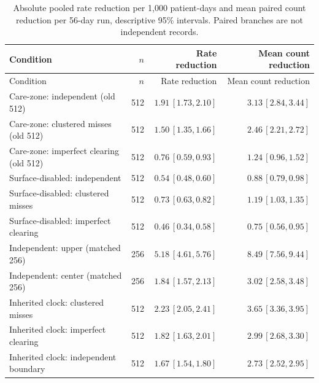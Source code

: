 \documentclass[11pt]{article}
\begin{document}
{\begin{longtable}{>{\raggedright\arraybackslash}p{.38\linewidth}rrr}
\caption{Absolute pooled rate reduction per 1,000 patient-days and mean paired count reduction per 56-day run, descriptive 95\% intervals. Paired branches are not independent records.}\label{tab:rule-absolute}\\
\toprule
Condition & $n$ & Rate reduction & Mean count reduction\\\midrule\endfirsthead
Condition & $n$ & Rate reduction & Mean count reduction\\\midrule\endhead
Care-zone: independent (old 512) & 512 & $1.91\,[1.73, 2.10]$ & $3.13\,[2.84, 3.44]$\\
Care-zone: clustered misses (old 512) & 512 & $1.50\,[1.35, 1.66]$ & $2.46\,[2.21, 2.72]$\\
Care-zone: imperfect clearing (old 512) & 512 & $0.76\,[0.59, 0.93]$ & $1.24\,[0.96, 1.52]$\\
Surface-disabled: independent & 512 & $0.54\,[0.48, 0.60]$ & $0.88\,[0.79, 0.98]$\\
Surface-disabled: clustered misses & 512 & $0.73\,[0.63, 0.82]$ & $1.19\,[1.03, 1.35]$\\
Surface-disabled: imperfect clearing & 512 & $0.46\,[0.34, 0.58]$ & $0.75\,[0.56, 0.95]$\\
Independent: upper (matched 256) & 256 & $5.18\,[4.61, 5.76]$ & $8.49\,[7.56, 9.44]$\\
Independent: center (matched 256) & 256 & $1.84\,[1.57, 2.13]$ & $3.02\,[2.58, 3.48]$\\
Inherited clock: clustered misses & 512 & $2.23\,[2.05, 2.41]$ & $3.65\,[3.36, 3.95]$\\
Inherited clock: imperfect clearing & 512 & $1.82\,[1.63, 2.01]$ & $2.99\,[2.68, 3.30]$\\
Inherited clock: independent boundary & 512 & $1.67\,[1.54, 1.80]$ & $2.73\,[2.52, 2.95]$\\
\bottomrule\end{longtable}

}
\end{document}
